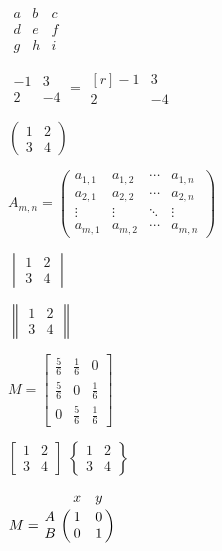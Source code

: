 \documentclass{article}
\begin{document}
$\begin{matrix}
a & b & c \\
d & e & f \\
g & h & i
\end{matrix}$

$\begin{matrix}
-1 & 3 \\
2 & -4
\end{matrix}
=
\begin{matrix*}[r]
-1 & 3 \\
2 & -4
\end{matrix*}$

$
\left(
  \begin{array}{cc}
    1 & 2 \\
    3 & 4
  \end{array}
\right)
$

 
$A_{m,n} =
\begin{pmatrix}
a_{1,1} & a_{1,2} & \cdots & a_{1,n} \\
a_{2,1} & a_{2,2} & \cdots & a_{2,n} \\
\vdots  & \vdots  & \ddots & \vdots  \\
a_{m,1} & a_{m,2} & \cdots & a_{m,n}
\end{pmatrix}$

$
\begin{vmatrix}
   1 & 2 \\
   3 & 4
\end{vmatrix}
$

$
\begin{Vmatrix}
  1 & 2 \\
  3 & 4
\end{Vmatrix}
$

$
M = \begin{bmatrix}
       \frac{5}{6} & \frac{1}{6} & 0           \\[0.3em]
       \frac{5}{6} & 0           & \frac{1}{6} \\[0.3em]
       0           & \frac{5}{6} & \frac{1}{6}
     \end{bmatrix}$

$
\begin{bmatrix}
  1 & 2 \\
  3 & 4
\end{bmatrix}
$
$
\begin{Bmatrix}
  1 & 2 \\
  3 & 4
\end{Bmatrix}
$

$M = \bordermatrix{~ & x & y \cr
                  A & 1 & 0 \cr
                  B & 0 & 1 \cr}$
\end{document}
